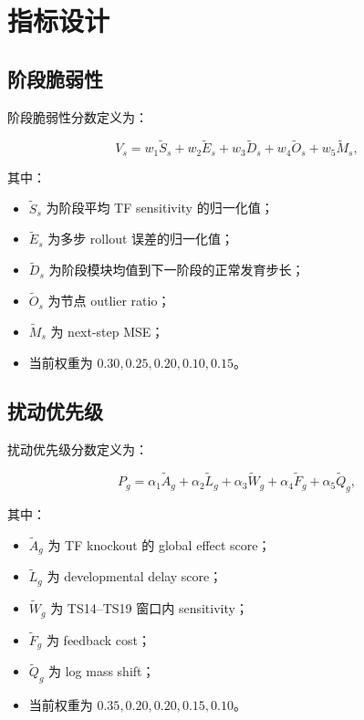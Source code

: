 \documentclass[UTF8,12pt]{ctexart}
\begin{document}
\section{指标设计}

\subsection{阶段脆弱性}

阶段脆弱性分数定义为：

\begin{equation}
V_s =
w_1 \tilde{S}_s
+ w_2 \tilde{E}_s
+ w_3 \tilde{D}_s
+ w_4 \tilde{O}_s
+ w_5 \tilde{M}_s,
\end{equation}

其中：

\begin{itemize}
    \item $\tilde{S}_s$ 为阶段平均 TF sensitivity 的归一化值；
    \item $\tilde{E}_s$ 为多步 rollout 误差的归一化值；
    \item $\tilde{D}_s$ 为阶段模块均值到下一阶段的正常发育步长；
    \item $\tilde{O}_s$ 为节点 outlier ratio；
    \item $\tilde{M}_s$ 为 next-step MSE；
    \item 当前权重为 $0.30, 0.25, 0.20, 0.10, 0.15$。
\end{itemize}

\subsection{扰动优先级}

扰动优先级分数定义为：

\begin{equation}
P_g =
\alpha_1 \tilde{A}_g
+ \alpha_2 \tilde{L}_g
+ \alpha_3 \tilde{W}_g
+ \alpha_4 \tilde{F}_g
+ \alpha_5 \tilde{Q}_g,
\end{equation}

其中：

\begin{itemize}
    \item $\tilde{A}_g$ 为 TF knockout 的 global effect score；
    \item $\tilde{L}_g$ 为 developmental delay score；
    \item $\tilde{W}_g$ 为 TS14--TS19 窗口内 sensitivity；
    \item $\tilde{F}_g$ 为 feedback cost；
    \item $\tilde{Q}_g$ 为 log mass shift；
    \item 当前权重为 $0.35, 0.20, 0.20, 0.15, 0.10$。
\end{itemize}
\end{document}
